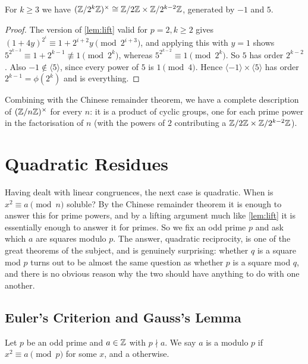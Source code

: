 \documentclass[a4paper]{scrartcl}
\begin{document}
\begin{proposition}
	For $k \geq 3$ we have $(\mathbb{Z}/2^k\mathbb{Z})^\times \cong \mathbb{Z}/2\mathbb{Z} \times \mathbb{Z}/2^{k-2}\mathbb{Z}$, generated by $-1$ and $5$.
\end{proposition}
\begin{proof}
	The version of \autoref{lem:lift} valid for $p = 2, k \geq 2$ gives $(1 + 4y)^{2^i} \equiv 1 + 2^{i+2}y \pmod{2^{i+3}}$, and applying this with $y = 1$ shows $5^{2^{k-3}} \equiv 1 + 2^{k-1} \not\equiv 1 \pmod{2^k}$, whereas $5^{2^{k-2}} \equiv 1 \pmod{2^k}$. So $5$ has order $2^{k-2}$. Also $-1 \notin \langle 5 \rangle$, since every power of $5$ is $1 \pmod 4$. Hence $\langle -1 \rangle \times \langle 5 \rangle$ has order $2^{k-1} = \phi(2^k)$ and is everything.
\end{proof}

Combining with the Chinese remainder theorem, we have a complete description of $(\mathbb{Z}/n\mathbb{Z})^\times$ for every $n$: it is a product of cyclic groups, one for each prime power in the factorisation of $n$ (with the powers of $2$ contributing a $\mathbb{Z}/2\mathbb{Z} \times \mathbb{Z}/2^{k-2}\mathbb{Z}$).

\section{Quadratic Residues}

Having dealt with linear congruences, the next case is quadratic. When is $x^2 \equiv a \pmod n$ soluble? By the Chinese remainder theorem it is enough to answer this for prime powers, and by a lifting argument much like \autoref{lem:lift} it is essentially enough to answer it for primes. So we fix an odd prime $p$ and ask which $a$ are squares modulo $p$. The answer, quadratic reciprocity, is one of the great theorems of the subject, and is genuinely surprising: whether $q$ is a square mod $p$ turns out to be almost the same question as whether $p$ is a square mod $q$, and there is no obvious reason why the two should have anything to do with one another.

\subsection{Euler's Criterion and Gauss's Lemma}

\begin{definition}
	Let $p$ be an odd prime and $a \in \mathbb{Z}$ with $p \nmid a$. We say $a$ is a  modulo $p$ if $x^2 \equiv a \pmod p$ for some $x$, and a  otherwise.
\end{definition}
\end{document}
